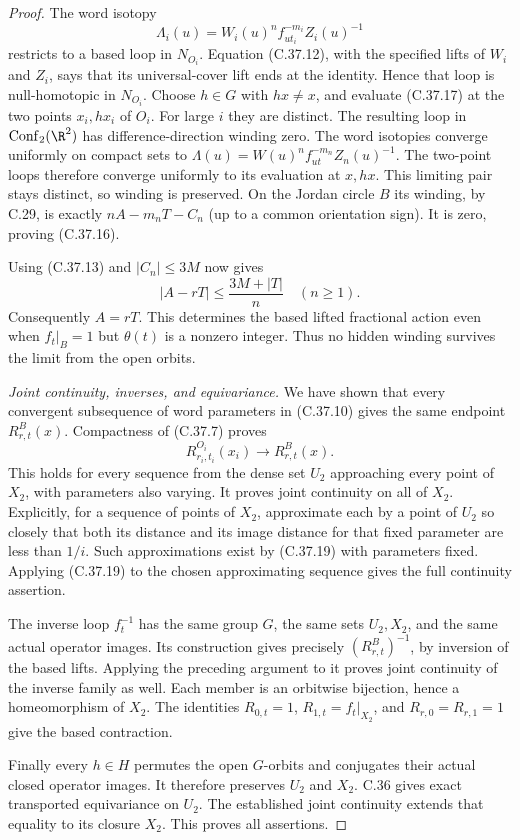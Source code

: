\begin{proof}
The word isotopy
\[
 \Lambda_i(u)=W_i(u)^n f_{u t_i}^{-m_i}Z_i(u)^{-1}
                                                        \tag{C.37.17}
\]
restricts to a based loop in $N_{O_i}$.
Equation (C.37.12), with the specified lifts of $W_i$ and
$Z_i$, says that its universal-cover lift ends at the
identity. Hence that loop is null-homotopic in $N_{O_i}$.
Choose $h\in G$ with $hx\ne x$, and evaluate (C.37.17)
at the two points $x_i,hx_i$ of $O_i$.
For large $i$ they are distinct. The resulting loop in
$\operatorname{Conf}_2(\R^2)$ has difference-direction
winding zero. The word isotopies converge uniformly on
compact sets to
$\Lambda(u)=W(u)^n f_{ut}^{-m_n}Z_n(u)^{-1}$.
The two-point loops therefore converge uniformly to its
evaluation at $x,hx$. This limiting pair stays distinct,
so winding is preserved.
On the Jordan circle $B$ its winding, by C.29, is exactly
$nA-m_nT-C_n$ (up to a common orientation sign).
It is zero, proving (C.37.16).

Using (C.37.13) and $|C_n|\leq3M$ now gives
\[
        |A-rT|\leq\frac{3M+|T|}{n}\quad(n\geq1).
                                                        \tag{C.37.18}
\]
Consequently $A=rT$. This determines the based lifted
fractional action even when $f_t|_B=1$ but $\theta(t)$
is a nonzero integer. Thus no hidden winding survives
the limit from the open orbits.

\emph{Joint continuity, inverses, and equivariance.}
We have shown that every convergent subsequence of word
parameters in (C.37.10) gives the same endpoint
$R^B_{r,t}(x)$. Compactness of (C.37.7) proves
\[
          R^{O_i}_{r_i,t_i}(x_i)
                  \longrightarrow R^B_{r,t}(x).
                                                        \tag{C.37.19}
\]
This holds for every sequence from the dense set $U_2$
approaching every point of $X_2$, with parameters also
varying. It proves joint continuity on all of $X_2$.
Explicitly, for a sequence of points of $X_2$, approximate
each by a point of $U_2$ so closely that both its distance
and its image distance for that fixed parameter are
less than $1/i$. Such approximations exist by
(C.37.19) with parameters fixed. Applying (C.37.19) to
the chosen approximating sequence gives the full
continuity assertion.

The inverse loop $f_t^{-1}$ has the same group $G$,
the same sets $U_2,X_2$, and the same actual operator
images. Its construction gives precisely
$(R^B_{r,t})^{-1}$, by inversion of the based lifts.
Applying the preceding argument to it proves joint
continuity of the inverse family as well. Each member
is an orbitwise bijection, hence a homeomorphism of
$X_2$. The identities $R_{0,t}=1$, $R_{1,t}=f_t|_{X_2}$,
and $R_{r,0}=R_{r,1}=1$ give the based contraction.

Finally every $h\in H$ permutes the open $G$-orbits and
conjugates their actual closed operator images.
It therefore preserves $U_2$ and $X_2$.
C.36 gives exact transported equivariance on $U_2$.
The established joint continuity extends that equality
to its closure $X_2$. This proves all assertions.
\end{proof}

